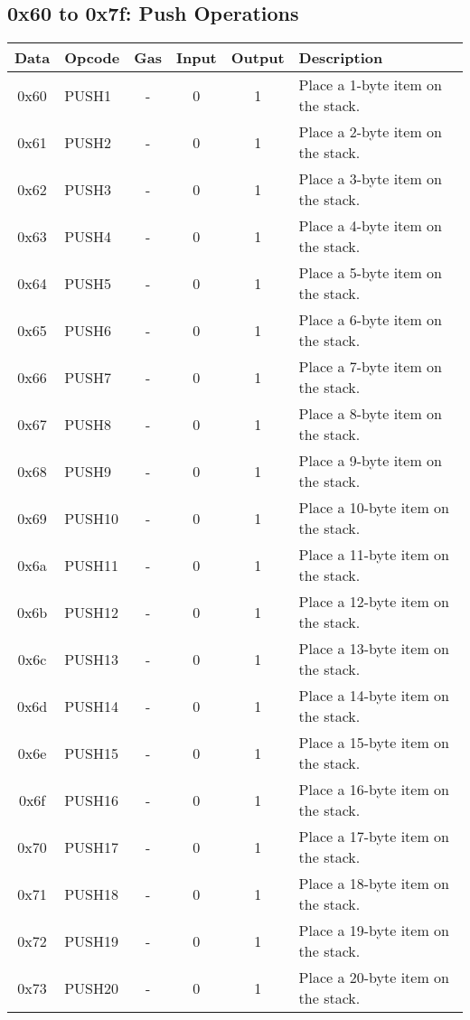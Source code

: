 \documentclass[10pt,a4paper,leqno,bibliography=totoc]{scrartcl}
\newenvironment{alphafootnotes}
{\par\edef\savedfootnotenumber{\number\value{footnote}}
\renewcommand{\thefootnote}{\alph{footnote}}
\setcounter{footnote}{0}}
{\par\setcounter{footnote}{\savedfootnotenumber}}
\begin{document}
\begin{alphafootnotes}
		\subsection{0x60 to 0x7f: Push Operations}
			\begin{longtable}{|cP{2.8cm}cccp{6cm}|}
        		\hline
        		\textbf{Data} & \textbf{Opcode} & \textbf{Gas}  & \textbf{Input}  & \textbf{Output} & \textbf{Description} \\
        		\hline
			0x60 & PUSH1 & - & 0 & 1 & Place a 1-byte item on the stack. \\
			0x61 & PUSH2 & - & 0 & 1 & Place a 2-byte item on the stack. \\
			0x62 & PUSH3 & - & 0 & 1 & Place a 3-byte item on the stack. \\
			0x63 & PUSH4 & - & 0 & 1 & Place a 4-byte item on the stack. \\
			0x64 & PUSH5 & - & 0 & 1 & Place a 5-byte item on the stack. \\
			0x65 & PUSH6 & - & 0 & 1 & Place a 6-byte item on the stack. \\
			0x66 & PUSH7 & - & 0 & 1 & Place a 7-byte item on the stack. \\
			0x67 & PUSH8 & - & 0 & 1 & Place a 8-byte item on the stack. \\
			0x68 & PUSH9 & - & 0 & 1 & Place a 9-byte item on the stack. \\
			0x69 & PUSH10 & - & 0 & 1 & Place a 10-byte item on the stack. \\
			0x6a & PUSH11 & - & 0 & 1 & Place a 11-byte item on the stack. \\
			0x6b & PUSH12 & - & 0 & 1 & Place a 12-byte item on the stack. \\
			0x6c & PUSH13 & - & 0 & 1 & Place a 13-byte item on the stack. \\
			0x6d & PUSH14 & - & 0 & 1 & Place a 14-byte item on the stack. \\
			0x6e & PUSH15 & - & 0 & 1 & Place a 15-byte item on the stack. \\
			0x6f & PUSH16 & - & 0 & 1 & Place a 16-byte item on the stack. \\
			0x70 & PUSH17 & - & 0 & 1 & Place a 17-byte item on the stack. \\
			0x71 & PUSH18 & - & 0 & 1 & Place a 18-byte item on the stack. \\
			0x72 & PUSH19 & - & 0 & 1 & Place a 19-byte item on the stack. \\
			0x73 & PUSH20 & - & 0 & 1 & Place a 20-byte item on the stack. \\

\end{longtable}
\end{alphafootnotes}
\end{document}
